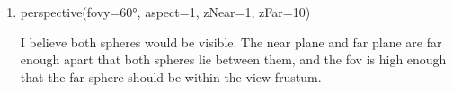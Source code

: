 \documentclass{article}
\begin{document}
\begin{enumerate}
\begin{enumerate}
\begin{enumerate}
                        \item perspective(fovy=60°, aspect=1, zNear=1, zFar=10)
                            \begin{mdframed}
                                I believe both spheres would be visible.
                                The near plane and far plane are far enough apart that
                                both spheres lie between them, and the fov is high
                                enough that the far sphere should be within the view
                                frustum.
                            \end{mdframed}
                    \end{enumerate}
            \end{enumerate}
    \end{enumerate}
\end{document}
